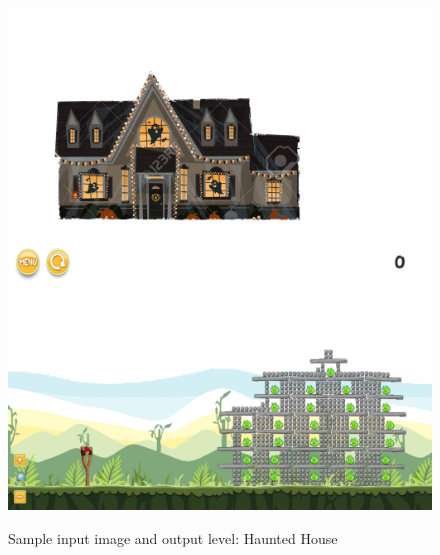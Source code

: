 \documentclass{dalthesis}
\begin{document}
\begin{figure}
	\caption{Sample input image and output level: Haunted House}
  \includegraphics[width=\textwidth,height=\textheight,keepaspectratio]{levels/pictures/halloween/haunted_house.jpg}
  \includegraphics[width=\textwidth,height=\textheight,keepaspectratio]{levels/screenshots/halloween/haunted_house.png}
\end{figure}
\end{document}
